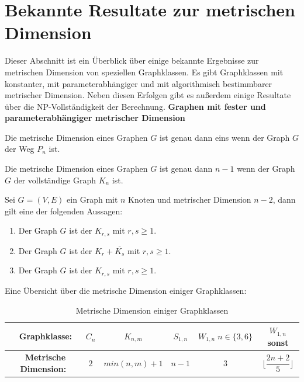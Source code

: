 \section{Bekannte Resultate zur metrischen Dimension}
\vspace{-2mm}
Dieser Abschnitt ist ein Überblick über einige bekannte Ergebnisse zur metrischen Dimension von speziellen Graphklassen. Es gibt Graphklassen mit konstanter, mit parameterabhängiger und mit algorithmisch bestimmbarer metrischer Dimension.\newline
Neben diesen Erfolgen gibt es außerdem einige Resultate über die NP-Vollständigkeit der Berechnung.\newline\newline
{\textbf{Graphen mit fester und parameterabhängiger metrischer Dimension}}
\begin{lem}
\label{path}\cite{landmarks}
Die metrische Dimension eines Graphen $G$ ist genau dann eins wenn der Graph $G$ der Weg $P_n$ ist.
\end{lem}
\begin{lem}
\label{complete}\cite{upper}
Die metrische Dimension eines Graphen $G$ ist genau dann $n-1$ wenn der Graph $G$ der vollständige Graph $K_n$ ist.
\end{lem}
\begin{lem}\cite{upper}
Sei $G = (V, E)$ ein Graph mit $n$ Knoten und metrischer Dimension $n-2$, dann gilt eine der folgenden Aussagen:
\begin{enumerate}
\item Der Graph $G$ ist der $K_{r,s}$ mit $r,s \geq 1$.
\item Der Graph $G$ ist der $K_{r}+ \overline{K_s}$ mit $r,s \geq 1$.
\item Der Graph $G$ ist der $K_{r,s}$ mit $r,s \geq 1$.
\end{enumerate}
\end{lem}
Eine Übersicht über die metrische Dimension einiger Graphklassen:
  \begin{table}[htb]
     \centering
     \begin{tabularx}{\textwidth}{|c|c|c|c|c|c|}
     	\hline  
       \parbox[c][4em][c]{0pt}{~}\textbf{Graphklasse:} & $C_n$&$K_{n,m}$&$S_{1,n}$&$W_{1,n}\;n \in \{3,6\}$&$W_{1,n}$ sonst \\[1em]
		\hline       
       \parbox[c][4em][c]{0pt}{~}\textbf{Metrische Dimension:}& $2$&$min(n,m)+1$& $n-1$  &$3$  &$\lfloor \dfrac{2n+2}{5} \rfloor$        \\[1em]
       	\hline  
     \end{tabularx}
 
     \caption{Metrische Dimension einiger Graphklassen}
     \label{tbl:Metrische Dimension einiger Graphklassen}
   \end{table}
